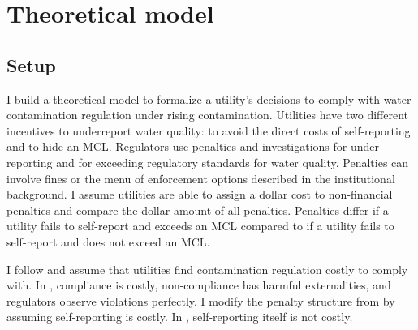 \section{Theoretical model}

\subsection{Setup}

I build a theoretical model to formalize a utility's decisions to comply with water contamination regulation under rising contamination. Utilities have two different incentives to underreport water quality: to avoid the direct costs of self-reporting and to hide an MCL. Regulators use penalties and investigations for under-reporting and for exceeding regulatory standards for water quality. Penalties can involve fines or the menu of enforcement options described in the institutional background. I assume utilities are able to assign a dollar cost to non-financial penalties and compare the dollar amount of all penalties. Penalties differ if a utility fails to self-report and exceeds an MCL compared to if a utility fails to self-report and does not exceed an MCL. 

I follow \textcite{mookherjee1994marginal} and assume that utilities find contamination regulation costly to comply with. In \textcite{mookherjee1994marginal}, compliance is costly, non-compliance has harmful externalities, and regulators observe violations perfectly. I modify the penalty structure from \textcite{kaplow1994optimal} by assuming self-reporting is costly. In \textcite{kaplow1994optimal}, self-reporting itself is not costly. 

